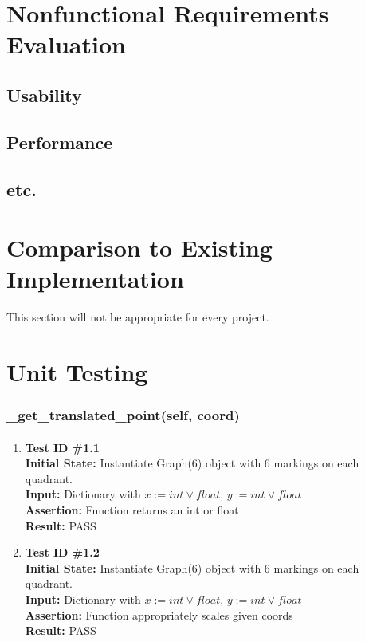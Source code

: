 \documentclass[12pt, titlepage]{article}
\begin{document}
\section{Nonfunctional Requirements Evaluation}
\subsection{Usability}
		
\subsection{Performance}
\subsection{etc.}
	
\section{Comparison to Existing Implementation}	
This section will not be appropriate for every project.


\section{Unit Testing}\label{sec:unittest}


\subsubsection{\_get\_translated\_point(self, coord)}		
	\label{sec:4.0.1}
	\paragraph{}
		\begin{enumerate}
			\item{\textbf{Test ID \#1.1\\}}
			\textbf{Initial State:} Instantiate Graph(6) object with 6 markings on each quadrant.\\
			\textbf{Input:} Dictionary with $x:= int \vee float$, $y:= int \vee float$ \\
			\textbf{Assertion:} Function returns an int or float \\
			\textbf{Result:} PASS
			
			\item{\textbf{Test ID \#1.2\\}}
			\textbf{Initial State:} Instantiate Graph(6) object with 6 markings on each quadrant.\\
			\textbf{Input:} Dictionary with $x:= int \vee float$, $y:= int \vee float$ \\
			\textbf{Assertion:} Function appropriately scales given coords \\
			\textbf{Result:} PASS
			
		\end{enumerate}
\end{document}
